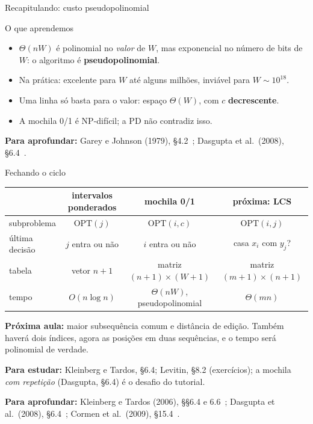 \documentclass[aspectratio=169,xcolor=table]{beamer}
\newcommand{\fonte}[1]{%
  \vfill
  {\tiny\color{gray!55!black}\textbf{Para aprofundar:} #1\par}%
}
\begin{document}
\begin{frame}{Recapitulando: custo pseudopolinomial}
  \begin{block}{O que aprendemos}
    \begin{itemize}\scriptsize
      \item $\Theta(nW)$ é polinomial no \emph{valor} de $W$, mas exponencial no número de
            bits de $W$: o algoritmo é \textbf{pseudopolinomial}.
      \item Na prática: excelente para $W$ até alguns milhões, inviável para $W \sim 10^{18}$.
      \item Uma linha só basta para o valor: espaço $\Theta(W)$, com $c$ \textbf{decrescente}.
      \item A mochila 0/1 é NP-difícil; a PD não contradiz isso.
    \end{itemize}
  \end{block}
  \fonte{Garey e Johnson (1979), \S 4.2~\cite{garey1979computers};
    Dasgupta et al.\ (2008), \S 6.4~\cite{dasgupta2008algorithms}.}
\end{frame}

\begin{frame}{Fechando o ciclo}
  \begin{center}
  \scriptsize
  \begin{tabular}{lccc}
    \toprule
    & intervalos ponderados & mochila 0/1 & próxima: LCS \\
    \midrule
    subproblema & $\mathrm{OPT}(j)$ & $\mathrm{OPT}(i,c)$ & $\mathrm{OPT}(i,j)$ \\
    última decisão & $j$ entra ou não & $i$ entra ou não & casa $x_i$ com $y_j$? \\
    tabela & vetor $n+1$ & matriz $(n{+}1)\times(W{+}1)$ & matriz $(m{+}1)\times(n{+}1)$ \\
    tempo & $O(n\log n)$ & $\Theta(nW)$, pseudopolinomial & $\Theta(mn)$ \\
    \bottomrule
  \end{tabular}
  \end{center}
  \medskip
  {\scriptsize
  \textbf{Próxima aula:} maior subsequência comum e distância de edição. Também haverá dois
  índices, agora as posições em duas sequências, e o tempo será polinomial de verdade.
  \smallskip

  \textbf{Para estudar:} Kleinberg e Tardos, \S 6.4; Levitin, \S 8.2 (exercícios); a mochila
  \emph{com repetição} (Dasgupta, \S 6.4) é o desafio do tutorial.}
  \fonte{Kleinberg e Tardos (2006), \S\S 6.4 e 6.6~\cite{kleinberg2006algorithm};
    Dasgupta et al.\ (2008), \S 6.4~\cite{dasgupta2008algorithms};
    Cormen et al.\ (2009), \S 15.4~\cite{cormen2009introduction}.}
\end{frame}
\end{document}
